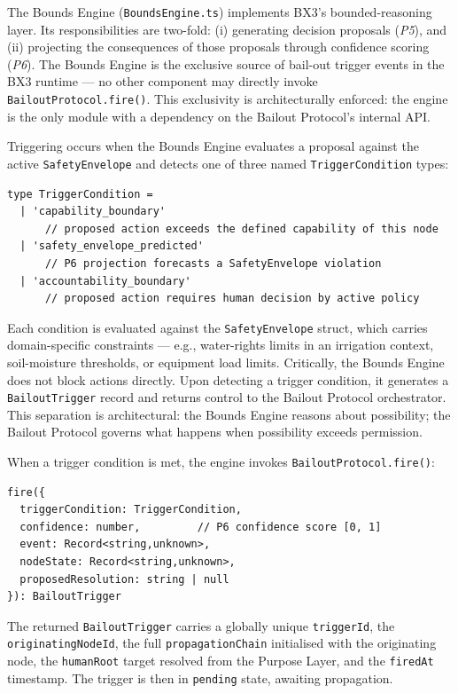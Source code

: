 The Bounds Engine (\texttt{BoundsEngine.ts}) implements BX3's bounded-reasoning layer.
Its responsibilities are two-fold: (i) generating decision proposals (\emph{P5}), and
(ii) projecting the consequences of those proposals through confidence scoring
(\emph{P6}).  The Bounds Engine is the exclusive source of bail-out trigger events
in the BX3 runtime — no other component may directly invoke \texttt{BailoutProtocol.fire()}.
This exclusivity is architecturally enforced: the engine is the only module with
a dependency on the Bailout Protocol's internal API.

Triggering occurs when the Bounds Engine evaluates a proposal against the active
\texttt{SafetyEnvelope} and detects one of three named \texttt{TriggerCondition} types:

\begin{verbatim}
type TriggerCondition =
  | 'capability_boundary'
      // proposed action exceeds the defined capability of this node
  | 'safety_envelope_predicted'
      // P6 projection forecasts a SafetyEnvelope violation
  | 'accountability_boundary'
      // proposed action requires human decision by active policy
\end{verbatim}

Each condition is evaluated against the \texttt{SafetyEnvelope} struct, which carries
domain-specific constraints — e.g., water-rights limits in an irrigation context,
soil-moisture thresholds, or equipment load limits.  Critically, the Bounds Engine
does not block actions directly.  Upon detecting a trigger condition, it generates
a \texttt{BailoutTrigger} record and returns control to the Bailout Protocol
orchestrator.  This separation is architectural: the Bounds Engine reasons about
possibility; the Bailout Protocol governs what happens when possibility exceeds
permission.

When a trigger condition is met, the engine invokes \texttt{BailoutProtocol.fire()}:

\begin{verbatim}
fire({
  triggerCondition: TriggerCondition,
  confidence: number,         // P6 confidence score [0, 1]
  event: Record<string,unknown>,
  nodeState: Record<string,unknown>,
  proposedResolution: string | null
}): BailoutTrigger
\end{verbatim}

The returned \texttt{BailoutTrigger} carries a globally unique \texttt{triggerId},
the \texttt{originatingNodeId}, the full \texttt{propagationChain} initialised with
the originating node, the \texttt{humanRoot} target resolved from the Purpose Layer,
and the \texttt{firedAt} timestamp.  The trigger is then in \texttt{pending} state,
awaiting propagation.

